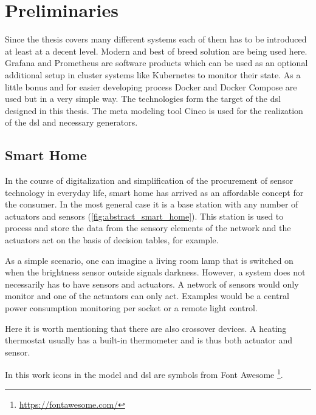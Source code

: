 \chapter{Preliminaries}
\label{chapter:grundlagen}

Since the thesis covers many different systems each of them has to be introduced at least at a decent level. Modern and best of breed solution are being used here. Grafana and Prometheus are software products which can be used as an optional additional setup in cluster systems like Kubernetes to monitor their state. As a little bonus and for easier developing process Docker and Docker Compose are used but in a very simple way. The technologies form the target of the \gls{dsl} designed in this thesis. The meta modeling tool Cinco is used for the realization of the \gls{dsl} and necessary generators.
 
\section{Smart Home}

In the course of digitalization and simplification of the procurement of sensor technology in everyday life, smart home has arrived as an affordable concept for the consumer. In the most general case it is a base station with any number of actuators and sensors (\cref{fig:abstract_smart_home}). This station is used to process and store the data from the sensory elements of the network and the actuators act on the basis of decision tables, for example. 

As a simple scenario, one can imagine a living room lamp that is switched on when the brightness sensor outside signals darkness. However, a system does not necessarily has to have sensors and actuators. A network of sensors would only monitor and one of the actuators can only act. Examples would be a central power consumption monitoring per socket or a remote light control.

Here it is worth mentioning that there are also crossover devices. A heating thermostat usually has a built-in thermometer and is thus both actuator and sensor.

In this work icons in the model and \gls{dsl} are symbols from Font Awesome \footnote{\url{https://fontawesome.com/}}.

